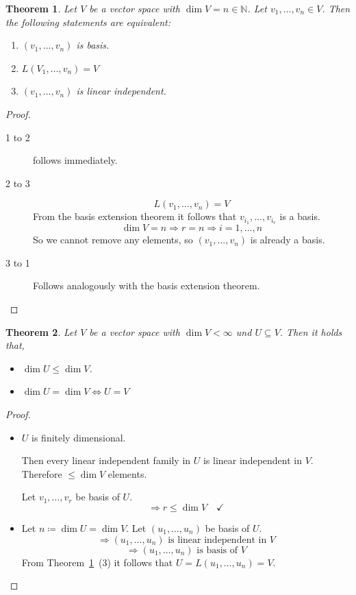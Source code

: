 \documentclass[a4paper,landscape,twocolumn]{article}
\newtheorem{theorem}{Theorem}
\begin{document}
\begin{theorem}
  \label{satz-3-34}
  Let $V$ be a vector space with $\dim{V} = n \in \mathbb N$.
  Let $v_1, \dots, v_n \in V$.
  Then the following statements are equivalent:
  \begin{enumerate}
    \item $(v_1, \dots, v_n)$ is basis.
    \item $L(V_1, \dots, v_n) = V$
    \item $(v_1, \dots, v_n)$ is linear independent.
  \end{enumerate}
\end{theorem}

\begin{proof}
  \begin{description}
    \item[1 to 2] follows immediately.
    \item[2 to 3]
      \[ L(v_1, \dots, v_n) = V \]
      From the basis extension theorem it follows that $v_{i_1}, \dots, v_{i_r}$ is a basis.
      \[ \dim{V} = n \Rightarrow r=n \Rightarrow i = 1, \dots, n \]
      So we cannot remove any elements, so $(v_1, \dots, v_n)$ is already a basis.
    \item[3 to 1]
      Follows analogously with the basis extension theorem.
  \end{description}
\end{proof}

\begin{theorem}
  \label{satz-3-35}
  Let $V$ be a vector space with $\dim{V} < \infty$ und $U \subseteq V$.
  Then it holds that,
  \begin{itemize}
    \item $\dim{U} \leq \dim{V}$.
    \item $\dim{U} = \dim{V} \Leftrightarrow U = V$
  \end{itemize}
\end{theorem}

\begin{proof}
  \begin{itemize}
    \item
      $U$ is finitely dimensional.

      Then every linear independent family in $U$ is linear independent in $V$.
      Therefore $\leq \dim{V}$ elements.

      Let $v_1, \dots, v_r$ be basis of $U$.
      \[ \Rightarrow r \leq \dim{V} \quad\checkmark \]
    \item
      Let $n \coloneqq \dim{U} = \dim{V}$. Let $(u_1, \dots, u_n)$ be basis of $U$.
      \[ \Rightarrow (u_1, \dots, u_n) \text{ is linear independent in } V \]
      \[ \Rightarrow (u_1, \dots, u_n) \text{ is basis of } V \]
      From Theorem~\ref{satz-3-34}~(3) it follows that $U = L(u_1, \dots, u_n) = V$.
  \end{itemize}
\end{proof}
\end{document}

